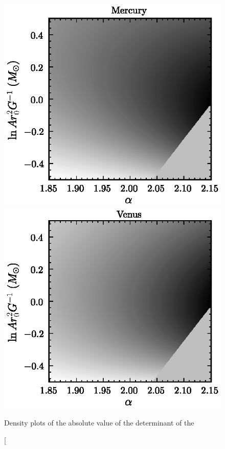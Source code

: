 \clearpage
\begin{figure}
\includegraphics[height=.4\textheight]{figs_solarsystem/ejacobian_Mercury.ps}\\[5pt]
\includegraphics[height=.4\textheight]{figs_solarsystem/ejacobian_Venus.ps}
\caption[Density plots of the absolute value of the determinant of the

\end{figure}
